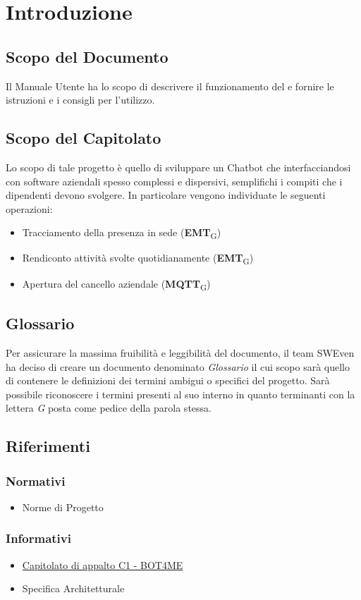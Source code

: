 \section{Introduzione}
\subsection{Scopo del Documento}
Il Manuale Utente ha lo scopo di descrivere il funzionamento del  e fornire le istruzioni e i consigli per l'utilizzo.

\subsection{Scopo del Capitolato}
Lo scopo di tale progetto è quello di sviluppare un Chatbot che interfacciandosi con software aziendali spesso complessi e dispersivi, semplifichi i compiti che i dipendenti devono svolgere. In particolare vengono individuate le seguenti operazioni: 
\begin{itemize}
	\item Tracciamento della presenza in sede (\textbf{EMT}\textsubscript{G})
	\item Rendiconto attività svolte quotidianamente (\textbf{EMT}\textsubscript{G})
	\item Apertura del cancello aziendale (\textbf{MQTT}\textsubscript{G})
\end{itemize}

\subsection{Glossario}
Per assicurare la massima fruibilità e leggibilità del documento, il team SWEven ha deciso di creare un documento denominato \textit{Glossario} il cui scopo sarà quello di contenere le definizioni dei termini ambigui o specifici del progetto. Sarà possibile riconoscere i termini presenti al suo interno in quanto terminanti con la lettera \textit{G} posta come pedice della parola stessa. 
\subsection{Riferimenti}
\subsubsection{Normativi}
\begin{itemize}
    \item Norme di Progetto \docVersionNdP
\end{itemize}
\subsubsection{Informativi}
\begin{itemize}
    \item \href{https://www.math.unipd.it/~tullio/IS-1/2021/Progetto/C1.pdf}{\color{blue} Capitolato di appalto C1 - BOT4ME}
    \item Specifica Architetturale \docVersionSA
\end{itemize}
\newpage